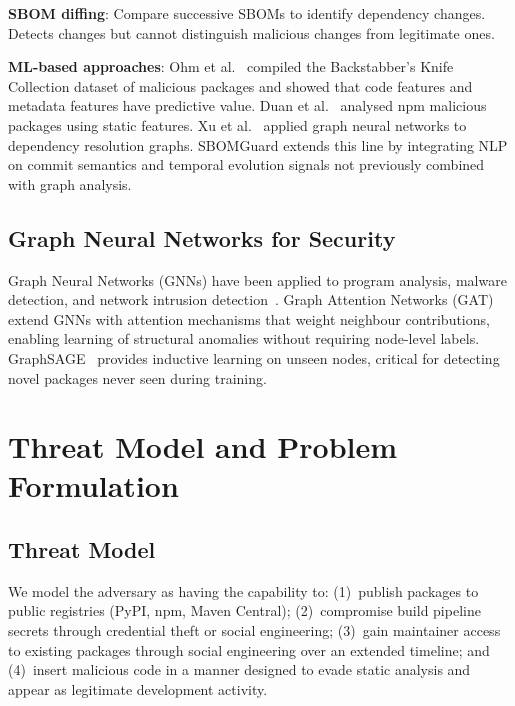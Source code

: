 \documentclass[sigconf,nonacm]{acmart}
\begin{document}
\textbf{SBOM diffing}: Compare successive SBOMs to identify dependency changes.
Detects changes but cannot distinguish malicious changes from legitimate ones.

\textbf{ML-based approaches}: Ohm et al.~\cite{ohm2020backstabbers} compiled the
Backstabber's Knife Collection dataset of malicious packages and showed that code
features and metadata features have predictive value. Duan et al.~\cite{duan2021risk}
analysed npm malicious packages using static features. Xu et al.~\cite{xu2023supplyml}
applied graph neural networks to dependency resolution graphs. SBOMGuard extends this
line by integrating NLP on commit semantics and temporal evolution signals not
previously combined with graph analysis.

\subsection{Graph Neural Networks for Security}

Graph Neural Networks (GNNs) have been applied to program analysis, malware
detection, and network intrusion detection~\cite{hamilton2020grl}. Graph Attention
Networks (GAT)~\cite{velickovic2018gat} extend GNNs with attention mechanisms that
weight neighbour contributions, enabling learning of structural anomalies without
requiring node-level labels. GraphSAGE~\cite{hamilton2017graphsage} provides
inductive learning on unseen nodes, critical for detecting novel packages never
seen during training.

\section{Threat Model and Problem Formulation}

\subsection{Threat Model}

We model the adversary as having the capability to: (1)~publish packages to public
registries (PyPI, npm, Maven Central); (2)~compromise build pipeline secrets through
credential theft or social engineering; (3)~gain maintainer access to existing
packages through social engineering over an extended timeline; and (4)~insert
malicious code in a manner designed to evade static analysis and appear as legitimate
development activity.
\end{document}
